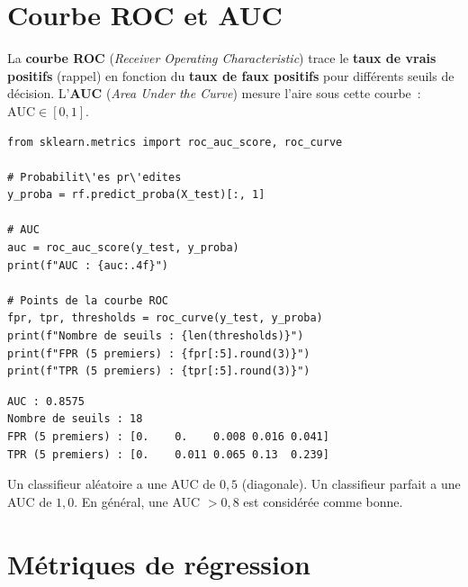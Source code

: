\section{Courbe ROC et AUC}
\label{sec:roc_auc}


\begin{definition}
La \textbf{courbe ROC} (\textit{Receiver Operating Characteristic}) trace le \textbf{taux de vrais positifs} (rappel) en fonction du \textbf{taux de faux positifs} pour diff\'erents seuils de d\'ecision. L'\textbf{AUC} (\textit{Area Under the Curve}) mesure l'aire sous cette courbe~: $\text{AUC} \in [0, 1]$.
\end{definition}

\begin{codeblock}[title=\textbf{Python}]
\begin{verbatim}
from sklearn.metrics import roc_auc_score, roc_curve

# Probabilit\'es pr\'edites
y_proba = rf.predict_proba(X_test)[:, 1]

# AUC
auc = roc_auc_score(y_test, y_proba)
print(f"AUC : {auc:.4f}")

# Points de la courbe ROC
fpr, tpr, thresholds = roc_curve(y_test, y_proba)
print(f"Nombre de seuils : {len(thresholds)}")
print(f"FPR (5 premiers) : {fpr[:5].round(3)}")
print(f"TPR (5 premiers) : {tpr[:5].round(3)}")
\end{verbatim}
\end{codeblock}

\begin{codeoutput}
\begin{verbatim}
AUC : 0.8575
Nombre de seuils : 18
FPR (5 premiers) : [0.    0.    0.008 0.016 0.041]
TPR (5 premiers) : [0.    0.011 0.065 0.13  0.239]
\end{verbatim}
\end{codeoutput}

\begin{remarque}
Un classifieur al\'eatoire a une AUC de $0{,}5$ (diagonale). Un classifieur parfait a une AUC de $1{,}0$. En g\'en\'eral, une AUC $> 0{,}8$ est consid\'er\'ee comme bonne.
\end{remarque}

\section{M\'etriques de r\'egression}
\label{sec:metriques_regression}


